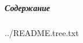 \documentclass[12pt, a4paper, simple, twoside]{eskdtext}
\begin{document}
  


  \newpage
  \subparagraph{Содержание} \hspace{0pt}

  
  {../README.tree.txt}
\end{document}
